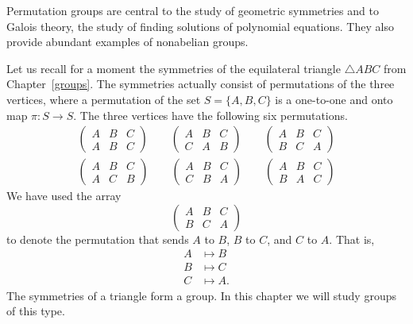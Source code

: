  
Permutation groups are central to the study of geometric symmetries
and to Galois theory, the study of finding solutions of polynomial
equations.  They also provide abundant examples of nonabelian groups. 
 
Let us recall for a moment  the symmetries of the equilateral triangle 
$\bigtriangleup ABC$ from Chapter~\ref{groups}. The symmetries actually consist
of permutations of the three vertices, where a {\bfi
permutation} of the set $S = \{ A, B, 
C \}$ is a one-to-one and onto map $\pi :S \rightarrow S$. The three
vertices have the following six permutations.  
\begin{gather*}
\begin{pmatrix}
A & B & C \\
A & B & C
\end{pmatrix}
\qquad
\begin{pmatrix}
A & B & C \\
C & A & B
\end{pmatrix}
\qquad
\begin{pmatrix}
A & B & C \\
B & C & A
\end{pmatrix}
\\
\begin{pmatrix}
A & B & C \\
A & C & B
\end{pmatrix}
\qquad
\begin{pmatrix}
A & B & C \\
C & B & A
\end{pmatrix}
\qquad
\begin{pmatrix}
A & B & C \\
B & A & C
\end{pmatrix}
\end{gather*}
We have used the array
\[
\begin{pmatrix}
A & B & C \\
B & C & A
\end{pmatrix}
\]
to  denote the permutation  that sends $A$ to $B$, $B$ to $C$, and $C$
to $A$. That is, 
\begin{align*}
A & \mapsto  B \\
B & \mapsto  C \\
C & \mapsto  A.
\end{align*}
The symmetries of a triangle form a group. In this chapter we will
study groups of this type.  
 

